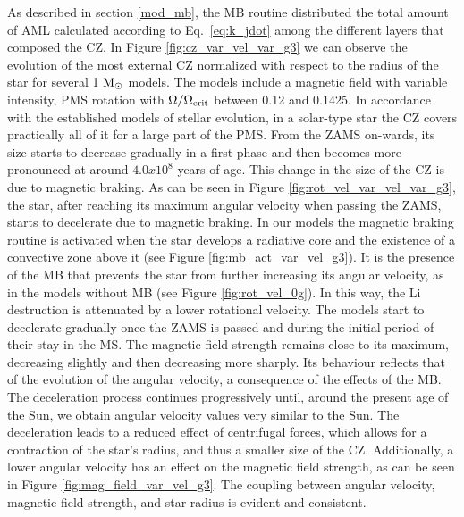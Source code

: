 \documentclass[fleqn,usenatbib]{mnras}
\begin{document}
\begin{ceqn}
As described in section \ref{mod_mb}, the MB routine distributed the total amount of AML calculated according to Eq.~\ref{eq:k_jdot} among the different layers that composed the CZ. In Figure \ref{fig:cz_var_vel_var_g3} we can observe the evolution of the most external CZ normalized with respect to the radius of the star for several 1 $\mathrm{M}_\odot$ models. The models include a magnetic field with variable intensity, PMS rotation with $\Omega / \Omega_{\mathrm{crit}}$ between 0.12 and 0.1425. In accordance with the established models of stellar evolution, in a solar-type star the CZ covers practically all of it for a large part of the PMS. From the ZAMS on-wards, its size starts to decrease gradually in a first phase and then becomes more pronounced at around $4.0x10^8$ years of age. This change in the size of the CZ is due to magnetic braking. As can be seen in Figure \ref{fig:rot_vel_var_vel_var_g3}, the star, after reaching its maximum angular velocity when passing the ZAMS, starts to decelerate due to magnetic braking. In our models the magnetic braking routine is activated when the star develops a radiative core and the existence of a convective zone above it (see Figure \ref{fig:mb_act_var_vel_g3}). It is the presence of the MB that prevents the star from further increasing its angular velocity, as in the models without MB (see Figure \ref{fig:rot_vel_0g}). In this way, the Li destruction is attenuated by a lower rotational velocity. The models start to decelerate gradually once the ZAMS is passed and during the initial period of their stay in the MS. The magnetic field strength remains close to its maximum, decreasing slightly and then decreasing more sharply. Its behaviour reflects that of the evolution of the angular velocity, a consequence of the effects of the MB. The deceleration process continues progressively until, around the present age of the Sun, we obtain angular velocity values very similar to the Sun. The deceleration leads to a reduced effect of centrifugal forces, which allows for a contraction of the star's radius, and thus a smaller size of the CZ. Additionally, a lower angular velocity has an effect on the magnetic field strength, as can be seen in Figure \ref{fig:mag_field_var_vel_g3}. The coupling between angular velocity, magnetic field strength, and star radius is evident and consistent.\par



\end{ceqn}
\end{document}
